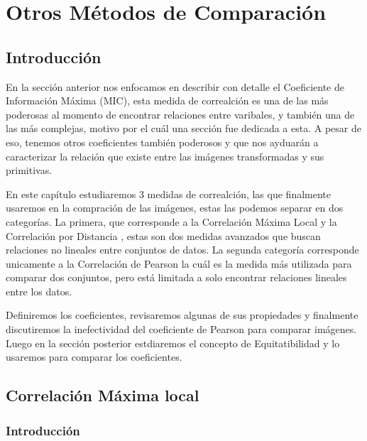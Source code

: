 \chapter{Otros M\'etodos de Comparaci\'on}\label{chap3}


\section{Introducci\'on}

En la secci\'on anterior nos enfocamos en describir con detalle el Coeficiente de Informaci\'on M\'axima (MIC), esta medida de correalci\'on es una de las m\'as poderosas al momento de encontrar relaciones entre varibales, y tambi\'en una de las m\'as complejas, motivo por el cu\'al una secci\'on fue dedicada a esta. A pesar de eso, tenemos otros coeficientes tambi\'en poderosos y que nos ayduar\'an a caracterizar la relaci\'on que existe entre las im\'agenes transformadas y sus primitivas. 

En este cap\'itulo estudiaremos 3 medidas de correalci\'on, las que finalmente usaremos en la compraci\'on de las im\'agenes, estas las podemos separar en dos categorías. La primera, que corresponde a la Correlaci\'on M\'axima Local\cite{Chen2012} y la Correlaci\'on por Distancia \cite{Szekely2009}, estas son dos medidas avanzados que buscan relaciones no lineales entre conjuntos de datos. La segunda categor\'ia corresponde unicamente a la Correlaci\'on de Pearson la cu\'al es la medida m\'as utilizada para comparar dos conjuntos, pero est\'a limitada a solo encontrar relaciones lineales entre los datos.

Definiremos los coeficientes, revisaremos algunas de sus propiedades y finalmente discutiremos la inefectividad del coeficiente de Pearson para comparar im\'agenes. Luego en la secci\'on posterior estdiaremos el concepto de Equitatibilidad y lo usaremos para comparar los coeficientes. 

\section[]{Correlaci\'on M\'axima local} 


	\subsection{Introducci\'on}


